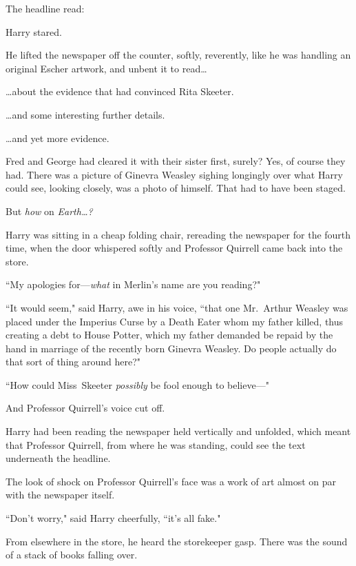 The headline read:


Harry stared.

He lifted the newspaper off the counter, softly, reverently, like he was handling an original Escher artwork, and unbent it to read{\ldots}

{\ldots}about the evidence that had convinced Rita Skeeter.

{\ldots}and some interesting further details.

{\ldots}and yet more evidence.

Fred and George had cleared it with their sister first, surely? Yes, of course they had. There was a picture of Ginevra Weasley sighing longingly over what Harry could see, looking closely, was a photo of himself. That had to have been staged.

But \emph{how} on \emph{Earth{\ldots}?}

Harry was sitting in a cheap folding chair, rereading the newspaper for the fourth time, when the door whispered softly and Professor Quirrell came back into the store.

``My apologies for—\emph{what} in Merlin's name are you reading?"

``It would seem," said Harry, awe in his voice, ``that one Mr.~Arthur Weasley was placed under the Imperius Curse by a Death Eater whom my father killed, thus creating a debt to House Potter, which my father demanded be repaid by the hand in marriage of the recently born Ginevra Weasley. Do people actually do that sort of thing around here?"

``How could Miss~Skeeter \emph{possibly} be fool enough to believe—"

And Professor Quirrell's voice cut off.

Harry had been reading the newspaper held vertically and unfolded, which meant that Professor Quirrell, from where he was standing, could see the text underneath the headline.

The look of shock on Professor Quirrell's face was a work of art almost on par with the newspaper itself.

``Don't worry," said Harry cheerfully, ``it's all fake."

From elsewhere in the store, he heard the storekeeper gasp. There was the sound of a stack of books falling over.

